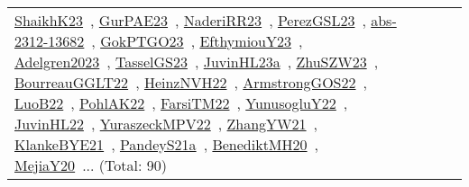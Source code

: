 {\begin{longtable}{lp{3cm}>{\raggedright\arraybackslash}p{6cm}>{\raggedright\arraybackslash}p{6cm}>{\raggedright\arraybackslash}p{8cm}}
\href{../works/ShaikhK23.pdf}{ShaikhK23}~\cite{ShaikhK23}, \href{../works/GurPAE23.pdf}{GurPAE23}~\cite{GurPAE23}, \href{../works/NaderiRR23.pdf}{NaderiRR23}~\cite{NaderiRR23}, \href{../works/PerezGSL23.pdf}{PerezGSL23}~\cite{PerezGSL23}, \href{../works/abs-2312-13682.pdf}{abs-2312-13682}~\cite{abs-2312-13682}, \href{../works/GokPTGO23.pdf}{GokPTGO23}~\cite{GokPTGO23}, \href{../works/EfthymiouY23.pdf}{EfthymiouY23}~\cite{EfthymiouY23}, \href{../works/Adelgren2023.pdf}{Adelgren2023}~\cite{Adelgren2023}, \href{../works/TasselGS23.pdf}{TasselGS23}~\cite{TasselGS23}, \href{../works/JuvinHL23a.pdf}{JuvinHL23a}~\cite{JuvinHL23a}, \href{../works/ZhuSZW23.pdf}{ZhuSZW23}~\cite{ZhuSZW23}, \href{../works/BourreauGGLT22.pdf}{BourreauGGLT22}~\cite{BourreauGGLT22}, \href{../works/HeinzNVH22.pdf}{HeinzNVH22}~\cite{HeinzNVH22}, \href{../works/ArmstrongGOS22.pdf}{ArmstrongGOS22}~\cite{ArmstrongGOS22}, \href{../works/LuoB22.pdf}{LuoB22}~\cite{LuoB22}, \href{../works/PohlAK22.pdf}{PohlAK22}~\cite{PohlAK22}, \href{../works/FarsiTM22.pdf}{FarsiTM22}~\cite{FarsiTM22}, \href{../works/YunusogluY22.pdf}{YunusogluY22}~\cite{YunusogluY22}, \href{../works/JuvinHL22.pdf}{JuvinHL22}~\cite{JuvinHL22}, \href{../works/YuraszeckMPV22.pdf}{YuraszeckMPV22}~\cite{YuraszeckMPV22}, \href{../works/ZhangYW21.pdf}{ZhangYW21}~\cite{ZhangYW21}, \href{../works/KlankeBYE21.pdf}{KlankeBYE21}~\cite{KlankeBYE21}, \href{../works/PandeyS21a.pdf}{PandeyS21a}~\cite{PandeyS21a}, \href{../works/BenediktMH20.pdf}{BenediktMH20}~\cite{BenediktMH20}, \href{../works/MejiaY20.pdf}{MejiaY20}~\cite{MejiaY20}... (Total: 90)\\

\end{longtable}}
